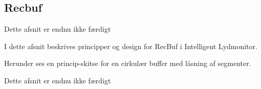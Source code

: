 \newpage
\subsection{Recbuf}
Dette afsnit er endnu ikke færdigt

I dette afsnit beskrives principper og design for RecBuf i Intelligent Lydmonitor.

Herunder ses en princip-skitse for en cirkulær buffer med låsning af segmenter.

Dette afsnit er endnu ikke færdigt
